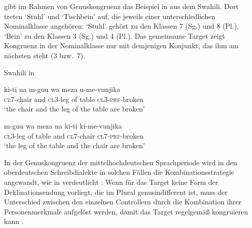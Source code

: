\citet[169]{corbett2006} gibt im Rahmen von Genuskongruenz das Beispiel in
 aus dem Swahili. Dort treten  `Stuhl' und  `Tischbein' auf, die jeweils einer unterschiedlichen
Nominalklasse angehören:  `Stuhl' gehört zu den Klassen 7 (Sg.)
und 8 (Pl.),  `Bein' zu den Klassen 3 (Sg.) und 4 (Pl.). Das
gemeinsame Target  zeigt Kongruenz in der Nominalklasse
nur mit demjenigen Konjunkt, das ihm am nächsten steht (3 bzw.~7).

\begin{exe}
\ex \label{ex:cca}
	\langinfo%
		{Swahili}%
		{}%
		{\cite[45]{bokamba1985} in \cite[169]{corbett2006}}
	\begin{xlist}
	\ex \label{ex:cca_1}
		\gll ki-ti na m-guu wa meza u-me-vunjika \\
			\textsc{cl7}-chair and \textsc{cl3}-leg of table
			\textsc{cl3}-\textsc{prf}-broken \\
		\trans `the chair and the leg of the table are broken'

	\ex \label{ex:cca_2}
		\gll m-guu wa meza na ki-ti ki-me-vunjika \\
			\textsc{cl3}-leg of table and \textsc{cl7}-chair
			\textsc{cl7}-\textsc{prf}-broken \\
		\trans `the leg of the table and the chair are broken'
	\end{xlist}
\end{exe}

In der Genuskongruenz der mittelhochdeutschen
Sprachperiode wird in den oberdeutschen Schreibdialekte in solchen Fällen die
Kombinationsstrategie angewandt, wie in  verdeutlicht
\autocites[vgl.][312]{grimm1890}[329]{grimm1898}[39--41]{behaghel1928}[187--189]{dal2014}:
Wenn für das Target keine Form der Deklinationsendung vorliegt, die im Plural
genusindifferent ist, muss der Unterschied zwischen den einzelnen Controllern
durch die Kombination ihrer Personenmerkmale aufgelöst werden, damit das Target
regelgemäß kongruieren kann
\autocites[vgl.][182--193]{corbett1983}[269--306]{corbett1991}[243--263]{corbett2006}.

